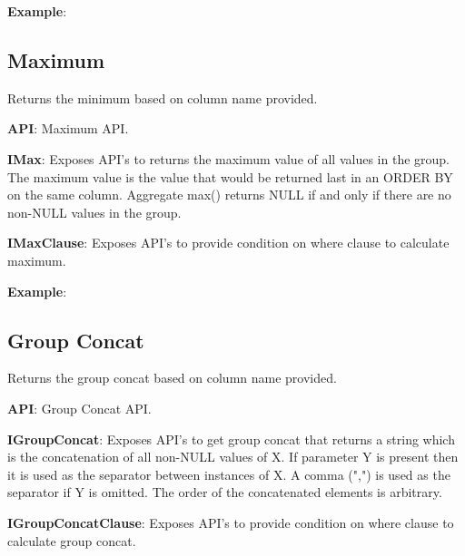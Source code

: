 			\textbf{Example}: 
				



	\subsection{Maximum} 
		\par 
		Returns the minimum based on column name provided.

			\textbf{API}: Maximum API.
				
		
			\textbf{IMax}:    Exposes API's to returns the maximum value of all values in the group.
						The maximum value is the value that would be returned last in an ORDER BY on the same column. 
						Aggregate max() returns NULL if and only if there are no non-NULL values in the group.


				

			
			\textbf{IMaxClause}: Exposes API's to provide condition on where clause to calculate maximum.
				

			\textbf{Example}: 
				


	\subsection{Group Concat} 
		\par 
		Returns the group concat based on column name provided.

			\textbf{API}: Group Concat API.
				
		
			\textbf{IGroupConcat}:     Exposes API's to get group concat that returns a string which is the concatenation of all non-NULL values of X.
							If parameter Y is present then it is used as the separator between instances of X. A comma (",") is used as the separator if Y is omitted.
							The order of the concatenated elements is arbitrary.


				

			
			\textbf{IGroupConcatClause}: Exposes API's to provide condition on where clause to calculate group concat.
				

